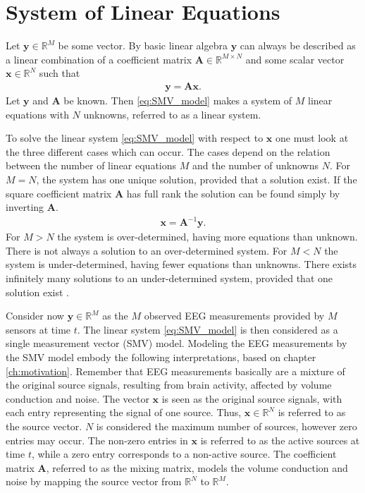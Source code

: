 \section{System of Linear Equations}\label{sec:SMV}
Let $\mathbf{y} \in \mathbb{R}^M$ be some vector. By basic linear algebra $\mathbf{y}$ can always be described as a linear combination of a coefficient matrix $\mathbf{A} \in \mathbb{R}^{M \times N}$ and some scalar vector $\mathbf{x} \in \mathbb{R}^N$ such that
\begin{align}\label{eq:SMV_model}
\mathbf{y} = \mathbf{Ax}.
\end{align}
Let $\mathbf{y}$ and $\mathbf{A}$ be known. Then \eqref{eq:SMV_model} makes a system of $M$ linear equations with $N$ unknowns, referred to as a linear system. 

To solve the linear system \eqref{eq:SMV_model} with respect to $\mathbf{x}$ one must look at the three different cases which can occur. 
The cases depend on the relation between the number of linear equations $M$ and the number of unknowns $N$.
For $M = N$, the system has one unique solution, provided that a solution exist. 
If the square coefficient matrix $\mathbf{A}$ has full rank the solution can be found simply by inverting $\mathbf{A}$.
\begin{align*}
\mathbf{x} = \mathbf{A}^{-1} \mathbf{y}.
\end{align*}
For $M > N$ the system is over-determined, having more equations than unknown. 
There is not always a solution to an over-determined system. 
For $M < N$ the system is under-determined, having fewer equations than unknowns. 
There exists infinitely many solutions to an under-determined system, provided that one solution exist \cite[p. ix]{CS}.  

Consider now $\mathbf{y} \in \mathbb{R}^M$ as the $M$ observed EEG measurements provided by $M$ sensors at time $t$. 
The linear system \eqref{eq:SMV_model} is then considered as a single measurement vector (SMV) model. 
Modeling the EEG measurements by the SMV model embody the following interpretations, based on chapter \ref{ch:motivation}.
Remember that EEG measurements basically are a mixture of the original source signals, resulting from brain activity, affected by volume conduction and noise.
The vector $\mathbf{x}$ is seen as the original source signals, with each entry representing the signal of one source. 
Thus, $\mathbf{x} \in \mathbb{R}^N$ is referred to as the source vector. 
$N$ is considered the maximum number of sources, however zero entries may occur. 
The non-zero entries in $\mathbf{x}$ is referred to as the active sources at time $t$, while a zero entry corresponds to a non-active source.   
The coefficient matrix $\mathbf{A}$, referred to as the mixing matrix, models the volume conduction and noise by mapping the source vector from $\mathbb{R}^N$ to $\mathbb{R}^M$.            

